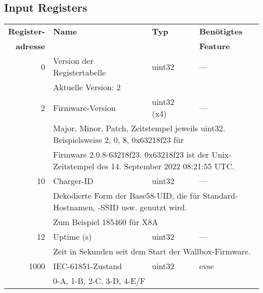 \documentclass[a4paper,10pt]{article}
\newcommand{\tdesc}[1]{\multicolumn{3}{l}{\footnotesize #1}}
\begin{document}
\subsection*{Input Registers}
\small
\begin{tabularx}{\textwidth}{rXll} \toprule
    \textbf{Register-} & \textbf{Name}& \textbf{Typ} & \textbf{Benötigtes}                                                      \\
    \textbf{adresse}   &              &              & \textbf{Feature}                                                         \\ \midrule
0             & Version der Registertabelle             & uint32       & ---                                     \\
              & \tdesc{Aktuelle Version: 2}                                                                                     \\ \cmidrule{2-4}
2             & Firmware-Version                       & uint32 (x4)       & ---                                                    \\
              & \tdesc{Major, Minor, Patch, Zeitstempel jeweils uint32. Beispielsweise 2, 0, 8, 0x63218f23 für}                 \\
              & \tdesc{Firmware 2.0.8-63218f23. 0x63218f23 ist der Unix-Zeitstempel des 14. September 2022 08:21:55 UTC.}       \\ \cmidrule{2-4}
10            & Charger-ID                              & uint32       & ---                                                    \\
              & \tdesc{Dekodierte Form der Base58-UID, die für Standard-Hostnamen, -SSID usw. genutzt wird.}                    \\
              & \tdesc{Zum Beispiel 185460 für X8A}                                                                             \\ \cmidrule{2-4}
12            & Uptime (s)                              & uint32       & ---                                                    \\
              & \tdesc{Zeit in Sekunden seit dem Start der Wallbox-Firmware.}                                                   \\ \cmidrule{2-4}
1000          & IEC-61851-Zustand                       & uint32       & evse                                                   \\
              & \tdesc{0-A, 1-B, 2-C, 3-D, 4-E/F}                                                                               \\ \cmidrule{2-4}

\end{tabularx}
\end{document}

